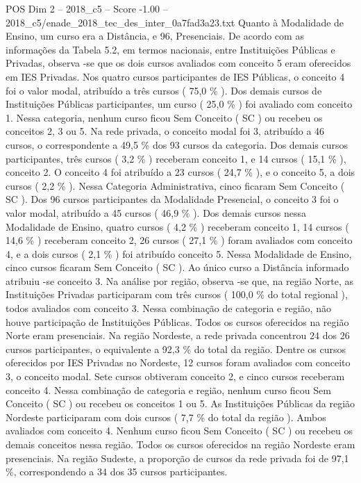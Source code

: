\begin{textsample}{POS Dim 2 – 2018\_c5 – Score -1.00 – 2018\_c5/enade\_2018\_tec\_des\_inter\_0a7fad3a23.txt}
Quanto à Modalidade de Ensino, um curso era a Distância, e 96, Presenciais.
De acordo com as informações da Tabela 5.2, em termos nacionais, entre Instituições Públicas e Privadas, observa -se que os dois cursos avaliados com conceito 5 eram oferecidos em IES Privadas.
Nos quatro cursos participantes de IES Públicas, o conceito 4 foi o valor modal, atribuído a três cursos ( 75,0 \% ).
Dos demais cursos de Instituições Públicas participantes, um curso ( 25,0 \% ) foi avaliado com conceito 1.
Nessa categoria, nenhum curso ficou Sem Conceito ( SC ) ou recebeu os conceitos 2, 3 ou 5.
Na rede privada, o conceito modal foi 3, atribuído a 46 cursos, o correspondente a 49,5 \% dos 93 cursos da categoria.
Dos demais cursos participantes, três cursos ( 3,2 \% ) receberam conceito 1, e 14 cursos ( 15,1 \% ), conceito 2.
O conceito 4 foi atribuído a 23 cursos ( 24,7 \% ), e o conceito 5, a dois cursos ( 2,2 \% ).
Nessa Categoria Administrativa, cinco ficaram Sem Conceito ( SC ).
Dos 96 cursos participantes da Modalidade Presencial, o conceito 3 foi o valor modal, atribuído a 45 cursos ( 46,9 \% ).
Dos demais cursos nessa Modalidade de Ensino, quatro cursos ( 4,2 \% ) receberam conceito 1, 14 cursos ( 14,6 \% ) receberam conceito 2, 26 cursos ( 27,1 \% ) foram avaliados com conceito 4, e a dois cursos ( 2,1 \% ) foi atribuído conceito 5.
Nessa Modalidade de Ensino, cinco cursos ficaram Sem Conceito ( SC ).
Ao único curso a Distância informado atribuiu -se conceito 3.
Na análise por região, observa -se que, na região Norte, as Instituições Privadas participaram com três cursos ( 100,0 \% do total regional ), todos avaliados com conceito 3.
Nessa combinação de categoria e região, não houve participação de Instituições Públicas.
Todos os cursos oferecidos na região Norte eram presenciais.
Na região Nordeste, a rede privada concentrou 24 dos 26 cursos participantes, o equivalente a 92,3 \% do total da região.
Dentre os cursos oferecidos por IES Privadas no Nordeste, 12 cursos foram avaliados com conceito 3, o conceito modal.
Sete cursos obtiveram conceito 2, e cinco cursos receberam conceito 4.
Nessa combinação de categoria e região, nenhum curso ficou Sem Conceito ( SC ) ou recebeu os conceitos 1 ou 5.
As Instituições Públicas da região Nordeste participaram com dois cursos ( 7,7 \% do total da região ).
Ambos avaliados com conceito 4.
Nenhum curso ficou Sem Conceito ( SC ) ou recebeu os demais conceitos nessa região.
Todos os cursos oferecidos na região Nordeste eram presenciais.
Na região Sudeste, a proporção de cursos da rede privada foi de 97,1 \%, correspondendo a 34 dos 35 cursos participantes.

\end{textsample}

